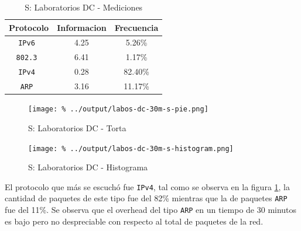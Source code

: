 \documentclass[final,inline,a4paper,narroweqnarray]{ieee}
\begin{document}
    \begin{table}\begin{center}
      \begin{tabular}{|c|c|c|}
      \hline
      \textbf{Protocolo} & \textbf{Informacion} & \textbf{Frecuencia} \\ \hline
      \texttt{IPv6      }& 4.25        & 5.26\%     \\ \hline
      \texttt{802.3     }& 6.41        & 1.17\%     \\ \hline
      \texttt{IPv4      }& 0.28        & 82.40\%    \\ \hline
      \texttt{ARP       }& 3.16        & 11.17\%    \\ \hline
      \end{tabular}
      \label{labos-dc-s-table}
      \caption{S: Laboratorios DC - Mediciones}
    \end{center}\end{table}

    \begin{figure}[ht]\begin{center}
      \texttt{[image: \%
      ../output/labos-dc-30m-s-pie.png]}
      \vspace{-3em}
      \caption{S: Laboratorios DC - Torta}
      \label{labos-dc-30m-s-pie}
    \end{center}\end{figure}

    \begin{figure}[ht]\begin{center}
      \texttt{[image: \%
      ../output/labos-dc-30m-s-histogram.png]}
      \caption{S: Laboratorios DC - Histograma}
      \label{labos-dc-30m-s-histogram}
    \end{center}\end{figure}


  El protocolo que más se escuchó fue \texttt{IPv4}, tal como se
  observa en la figura \ref{labos-dc-30m-s-pie}, la cantidad de
  paquetes  de este tipo fue del 82\% mientras que la de paquetes
  \texttt{ARP} fue del 11\%. Se observa que el overhead del tipo \texttt{ARP} 
  en un tiempo de 30 minutos es bajo pero no despreciable con respecto al 
  total de paquetes de la red.
\end{document}
